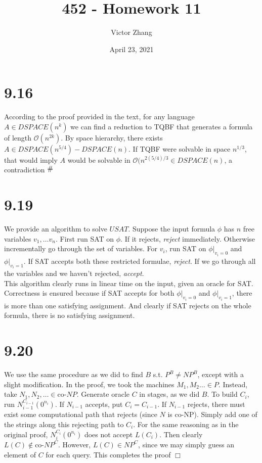 \documentclass{article}
\title{452 - Homework 11}
\author{Victor Zhang}
\date{April 23, 2021}
\newcommand{\contra}{\raisebox{\depth}{\#}}
\begin{document}
\maketitle

\section*{9.16}
According to the proof provided in the text, for any language $A \in DSPACE(n^k)$ we can find a reduction to TQBF that generates a formula of length $\mathcal{O}(n^{2k})$. By space hierarchy, there exists $A \in DSPACE(n^{5/4}) - DSPACE(n)$. If TQBF were solvable in space $n^{1/3}$, that would imply $A$ would be solvable in $\mathcal{O}(n^{2(5/4)/3} \in DSPACE(n)$, a contradiction $\contra$ 

\section*{9.19}
We provide an algorithm to solve $USAT$. Suppose the input formula $\phi$ has $n$ free variables $v_1, \dots v_n$. First run SAT on $\phi$. If it rejects, \textit{reject} immediately. Otherwise incrementally go through the set of variables. For $v_i$, run SAT on $\phi\big\vert_{v_i = 0}$ and $\phi\big\vert_{v_i = 1}$. If SAT accepts both these restricted formulae, \textit{reject}. If we go through all the variables and we haven't rejected, \textit{accept}.\\
This algorithm clearly runs in linear time on the input, given an oracle for SAT. Correctness is ensured because if SAT accepts for both $\phi\big\vert_{v_i = 0}$ and $\phi\big\vert_{v_i = 1}$, there is more than one satisfying assignment. And clearly if SAT rejects on the whole formula, there is no satisfying assignment.

\section*{9.20}
We use the same procedure as we did to find $B$ s.t. $P^B \neq NP^B$, except with a slight modification. In the proof, we took the machines $M_1, M_2 \dots \in P$. Instead, take $N_1, N_2, \dots \in \text{co-}NP$. Generate oracle $C$ in stages, as we did $B$. To build $C_i$, run $N_{i-1}^{C_{i-1}}(0^{n_i})$. If $N_{i-1}$ accepts, put $C_i = C_{i-1}$. If $N_{i-1}$ rejects, there must exist some computational path that rejects (since $N$ is co-NP). Simply add one of the strings along this rejecting path to $C_i$. For the same reasoning as in the original proof, $N_i^{C_i}(0^{n_i})$ does not accept $L(C_i)$. Then clearly $L(C) \notin \text{co-}NP^C$. However, $L(C) \in NP^C$, since we may simply guess an element of $C$ for each query. This completes the proof $\Box$
\end{document}
